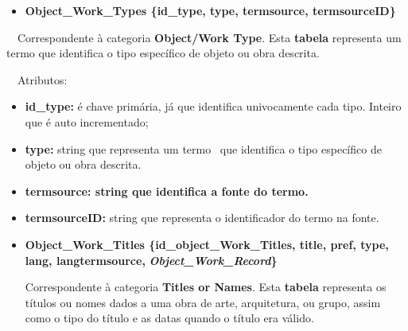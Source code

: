 \documentclass[letterpaper]{article}
\newcommand\textstyleStrongEmphasis[1]{\textbf{#1}}
\newcommand\liststyleLi{%
\renewcommand\labelitemi{{\textbullet}}
\renewcommand\labelitemii{[27A2?]}
\renewcommand\labelitemiii{{\textbullet}}
\renewcommand\labelitemiv{{\textbullet}}
}
\newcommand\liststyleLii{%
\renewcommand\labelitemi{[27A2?]}
\renewcommand\labelitemii{[27A2?]}
\renewcommand\labelitemiii{[27A2?]}
\renewcommand\labelitemiv{[27A2?]}
}
\begin{document}
\bigskip

\liststyleLi
\begin{itemize}
\item {\bfseries
Object\_Work\_Types\textmd{ \{}\textmd{id\_type}\textmd{, type,
termsource, termsourceID\}}}
\end{itemize}
{
\foreignlanguage{english}{\ \ Correspondente \`a categoria
}\foreignlanguage{english}{\textbf{Object/Work
Type}}\foreignlanguage{english}{. Esta
}\textstyleStrongEmphasis{\foreignlanguage{english}{\textmd{tabela}}}\foreignlanguage{english}{
representa um termo que identifica o tipo espec\'ifico de objeto ou
obra descrita.}}


\bigskip

{
\ \ Atributos:}

\liststyleLii
\begin{itemize}
\item {
\textbf{id\_type:} \'e chave prim\'aria, j\'a que identifica
univocamente cada tipo. Inteiro que \'e auto incrementado;}
\item {
\textbf{type:} string que representa um termo \ que identifica o tipo
espec\'ifico de objeto ou obra descrita.}
\item {\bfseries
termsource: \textmd{string que identifica a fonte do termo.}}
\item {
\textbf{termsourceID:} string que representa o identificador do termo na
fonte.}
\end{itemize}

\bigskip

\liststyleLi
\begin{itemize}
\item {
\textbf{Object\_Work\_Titles
\{}\textbf{id\_object\_Work\_Titles}\textbf{, title, pref, type, lang,
langtermsource, }\textbf{\textit{Object\_Work\_Record}}\textbf{\}}}

\foreignlanguage{english}{Correspondente \`a categoria
}\foreignlanguage{english}{\textbf{Titles or
Names}}\foreignlanguage{english}{. Esta
}\textstyleStrongEmphasis{\foreignlanguage{english}{\textmd{tabela}}}\foreignlanguage{english}{
representa os t\'itulos ou nomes dados a uma obra de arte, arquitetura,
ou grupo, assim como o tipo do t\'itulo e as datas quando o t\'itulo
era v\'alido.}
\end{itemize}
\end{document}
